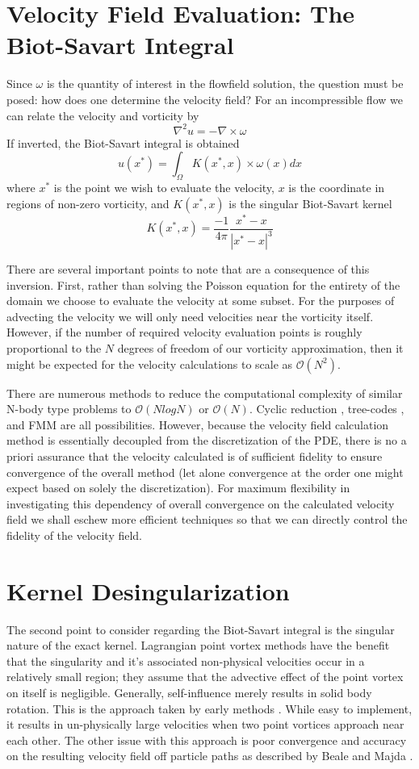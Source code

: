 \documentclass[letterpaper,12pt]{report}
\newcommand{\be}{\begin{equation}}
\newcommand{\ben}[1]{\begin{equation}\label{#1}}
\newcommand{\ee}{\end{equation}}
\begin{document}
\section{Velocity Field Evaluation: The Biot-Savart Integral}
Since $\omega$ is the quantity of interest in the flowfield solution, the question must be posed: how does one determine the velocity field? For an incompressible flow we can relate the velocity and vorticity by
\be \nabla^2 u = -\nabla \times \omega \ee
If inverted, the Biot-Savart integral is obtained
\ben{BS} u(x^*) = \int_\Omega K(x^*,x) \times \omega(x) dx \ee
where $x^*$ is the point we wish to evaluate the velocity, $x$ is the coordinate in regions of non-zero vorticity, and $K(x^*,x)$ is the singular Biot-Savart kernel
\ben{BSkern} K(x^*,x) = \frac{-1}{4 \pi} \frac{x^*-x}{|x^*-x|^3} \ee

There are several important points to note that are a consequence of this inversion. First, rather than solving the Poisson equation for the entirety of the domain we choose to evaluate the velocity at some subset. For the purposes of advecting the velocity we will only need velocities near the vorticity itself. However, if the number of required velocity evaluation points is roughly proportional to the $N$ degrees of freedom of our vorticity approximation, then it might be expected for the velocity calculations to scale as $\mathcal{O}(N^2)$.

There are numerous methods to reduce the computational complexity of similar N-body type problems to $\mathcal{O}(NlogN)$ or $\mathcal{O}(N)$. Cyclic reduction \cite{SchumannSweet1976}, tree-codes \cite{LindsayKrasny2001,BarnesHut1986}, and FMM \cite{GreengardRokhlin1987} are all possibilities. However, because the velocity field calculation method is essentially decoupled from the discretization of the PDE, there is no a priori assurance that the velocity calculated is of sufficient fidelity to ensure convergence of the overall method (let alone convergence at the order one might expect based on solely the discretization). For maximum flexibility in investigating this dependency of overall convergence on the calculated velocity field we shall eschew more efficient techniques so that we can directly control the fidelity of the velocity field.

\section{Kernel Desingularization} 
The second point to consider regarding the Biot-Savart integral is the singular nature of the exact kernel. Lagrangian point vortex methods have the benefit that the singularity and it's associated non-physical velocities occur in a relatively small region; they assume that the advective effect of the point vortex on itself is negligible. Generally, self-influence merely results in solid body rotation. This is the approach taken by early methods \cite{Point1}. While easy to implement, it results in un-physically large velocities when two point vortices approach near each other. The other issue with this approach is poor convergence and accuracy on the resulting velocity field off particle paths as described by Beale and Majda \cite{BealeMajda}.
\end{document}
